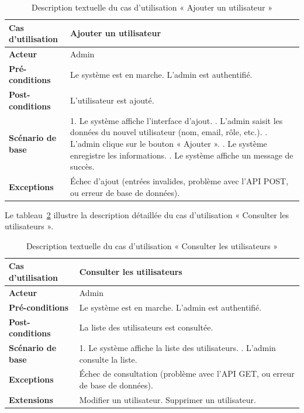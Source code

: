 \begin{table}[!ht]
\centering
\caption{Description textuelle du cas d’utilisation « Ajouter un utilisateur »}
\label{tab:add_user}
\renewcommand{\arraystretch}{1.2}
\begin{tabular}{|p{4.2cm}|p{11cm}|}
\hline
\textbf{Cas d'utilisation} & Ajouter un utilisateur \\
\hline
\textbf{Acteur} & Admin \\
\hline
\textbf{Pré-conditions} & Le système est en marche. \newline L’admin est authentifié. \\
\hline
\textbf{Post-conditions} & L'utilisateur est ajouté. \\
\hline
\textbf{Scénario de base} & 
1. Le système affiche l’interface d’ajout. \newline
2. L’admin saisit les données du nouvel utilisateur (nom, email, rôle, etc.). \newline
3. L’admin clique sur le bouton « Ajouter ». \newline
4. Le système enregistre les informations. \newline
5. Le système affiche un message de succès. \\
\hline
\textbf{Exceptions} & 
Échec d’ajout (entrées invalides, problème avec l’API POST, ou erreur de base de données). \\
\hline
\end{tabular}
\end{table}


Le tableau~\ref{tab:view_users} illustre la description détaillée du cas d'utilisation « Consulter les utilisateurs ».

\begin{table}[!ht]
\centering
\caption{Description textuelle du cas d’utilisation « Consulter les utilisateurs »}
\label{tab:view_users}
\renewcommand{\arraystretch}{1.2}
\begin{tabular}{|p{4.2cm}|p{11cm}|}
\hline
\textbf{Cas d'utilisation} & Consulter les utilisateurs \\
\hline
\textbf{Acteur} & Admin \\
\hline
\textbf{Pré-conditions} & Le système est en marche. \newline L’admin est authentifié. \\
\hline
\textbf{Post-conditions} & La liste des utilisateurs est consultée. \\
\hline
\textbf{Scénario de base} & 
1. Le système affiche la liste des utilisateurs. \newline
2. L’admin consulte la liste. \\
\hline
\textbf{Exceptions} & 
Échec de consultation (problème avec l’API GET, ou erreur de base de données). \\
\hline
\textbf{Extensions} & 
Modifier un utilisateur. \newline Supprimer un utilisateur. \\
\hline
\end{tabular}
\end{table}

